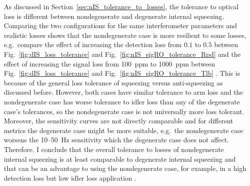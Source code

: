 As discussed in Section~\ref{sec:nIS_tolerance_to_losses}, the tolerance to optical loss is different between nondegenerate and degenerate internal squeezing. Comparing the two configurations for the same interferometer parameters and realistic losses shows that the nondegenerate case is more resilient to some losses, e.g.\ compare the effect of increasing the detection loss from $0.1$ to $0.5$ between Fig.~\ref{fig:dIS_loss_tolerance} and Fig.~\ref{fig:nIS_sigRO_tolerance_Rpd} and the effect of increasing the signal loss from 100~ppm to 1000~ppm between Fig.~\ref{fig:dIS_loss_tolerance} and Fig.~\ref{fig:nIS_sigRO_tolerance_Tlb} . 
This is because of the general loss tolerance of squeezing versus anti-squeezing as discussed before. %
However, both cases have similar tolerance to arm loss and the nondegenerate case has worse tolerance to idler loss than any of the degenerate case's tolerances, so the nondegenerate case is not universally more loss tolerant.  
Moreover, the sensitivity curves are not directly comparable and for different metrics the degenerate case might be more suitable, e.g.\ the nondegenerate case worsens the 10--50~Hz sensitivity which the degenerate case does not affect. %
Therefore, I conclude that the overall tolerance to losses of nondegenerate internal squeezing is at least comparable to degenerate internal squeezing and that can be an advantage to using the nondegenerate case, for example, in a high detection loss but low idler loss application . 


